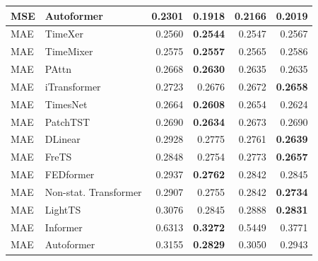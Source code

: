 \begin{longtable}{llrrrr}
MSE & Autoformer & 0.2301 & \textbf{0.1918} & 0.2166 & 0.2019 \\
\midrule
MAE & TimeXer & 0.2560 & \textbf{0.2544} & 0.2547 & 0.2567 \\
MAE & TimeMixer & 0.2575 & \textbf{0.2557} & 0.2565 & 0.2586 \\
MAE & PAttn & 0.2668 & \textbf{0.2630} & 0.2635 & 0.2635 \\
MAE & iTransformer & 0.2723 & 0.2676 & 0.2672 & \textbf{0.2658} \\
MAE & TimesNet & 0.2664 & \textbf{0.2608} & 0.2654 & 0.2624 \\
MAE & PatchTST & 0.2690 & \textbf{0.2634} & 0.2673 & 0.2690 \\
MAE & DLinear & 0.2928 & 0.2775 & 0.2761 & \textbf{0.2639} \\
MAE & FreTS & 0.2848 & 0.2754 & 0.2773 & \textbf{0.2657} \\
MAE & FEDformer & 0.2937 & \textbf{0.2762} & 0.2842 & 0.2845 \\
MAE & Non-stat. Transformer & 0.2907 & 0.2755 & 0.2842 & \textbf{0.2734} \\
MAE & LightTS & 0.3076 & 0.2845 & 0.2888 & \textbf{0.2831} \\
MAE & Informer & 0.6313 & \textbf{0.3272} & 0.5449 & 0.3771 \\
MAE & Autoformer & 0.3155 & \textbf{0.2829} & 0.3050 & 0.2943 \\
\end{longtable}
\endgroup


